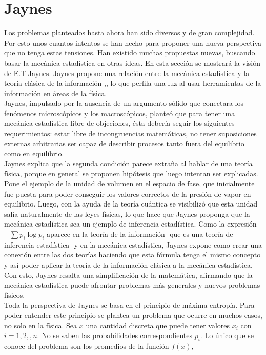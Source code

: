\section{Jaynes}
Los problemas planteados hasta ahora han sido diversos y de gran complejidad. Por esto unos cuantos intentos se han hecho para proponer una nueva perspectiva que no tenga estas tensiones. Han existido muchas propuestas nuevas, buscando basar la mecánica estadística en otras ideas. En esta sección se mostrará la visión de E.T Jaynes. Jaynes propone una relación entre la mecánica estadística y la teoría clásica de la información \cite{JaynesI},\cite{JaynesII}, lo que perfila una luz al usar herramientas de la información en áreas de la física.
\\
Jaynes, impulsado por la ausencia de un argumento sólido que conectara los fenómenos microscópicos y los macroscópicos, planteó que para tener una mecánica estadística libre de objeciones, ésta debería seguir los siguientes requerimientos: estar libre de incongruencias matemáticas, no tener suposiciones externas arbitrarias ser capaz de describir procesos tanto fuera del equilibrio como en equilibrio.
\\
Jaynes explica que la segunda condición parece extraña al hablar de una teoría física, porque en general se proponen hipótesis que luego intentan ser explicadas. Pone el ejemplo de la unidad de volumen en el espacio de fase, que inicialmente fue puesta para poder conseguir los valores correctos de la presión de vapor en equilibrio. Luego, con la ayuda de la teoría cuántica se visibilizó que esta unidad salía naturalmente de las leyes físicas, lo que hace que Jaynes proponga que la mecánica estadística sea un ejemplo de inferencia estadística. Como la expresión $- \sum p_{i} \log p_{i}$ aparece en la teoría de la información -que es una teoría de inferencia estadística- y en la mecánica estadística, Jaynes expone como crear una conexión entre las dos teorías haciendo que esta fórmula tenga el mismo concepto y así poder aplicar la teoría de la información clásica a la mecánica estadística. Con esto, Jaynes resalta  una simplificación de la matemática, afirmando que la mecánica estadística puede afrontar problemas más generales y nuevos problemas físicos.
\\
Toda la perspectiva de Jaynes se basa en el principio de máxima entropía. Para poder entender este principio se plantea un problema que ocurre en muchos casos, no solo en la física. Sea $x$ una cantidad discreta que puede tener valores $x_{i}$ con $i=1, 2,,n$. No se saben las probabilidades correspondientes $p_{i}$. Lo único que se conoce del problema son los promedios de la función $f(x)$,
